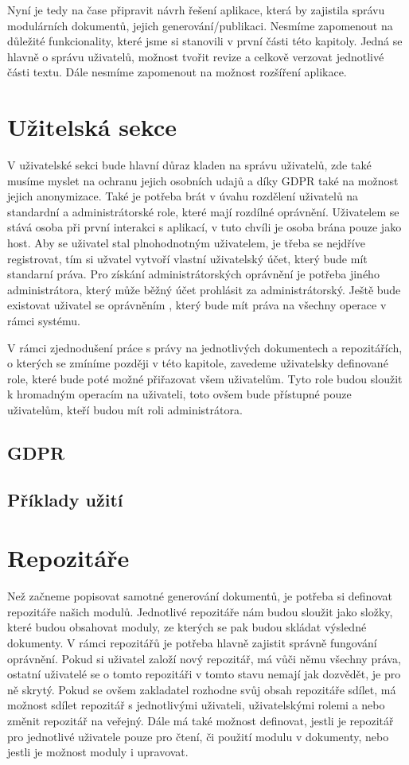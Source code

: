 Nyní je tedy na čase připravit návrh řešení aplikace, která by zajistila správu modulárních dokumentů, jejich generování/publikaci. Nesmíme zapomenout
na důležité funkcionality, které jsme si stanovili v první části této kapitoly. Jedná se hlavně o správu uživatelů, možnost tvořit revize a celkově
verzovat jednotlivé části textu. Dále nesmíme zapomenout na možnost rozšíření aplikace.

\section{Užitelská sekce}

V uživatelské sekci bude hlavní důraz kladen na správu uživatelů, zde také musíme myslet na ochranu jejich osobních udajů a díky GDPR také na
možnost jejich anonymizace. Také je potřeba brát v úvahu rozdělení uživatelů na standardní a administrátorské role, které mají rozdílné oprávnění.
Uživatelem se stává osoba při první interakci s aplikací, v tuto chvíli je osoba brána pouze jako host. Aby se uživatel stal plnohodnotným uživatelem,
je třeba se nejdříve registrovat, tím si užvatel vytvoří vlastní uživatelský účet, který bude mít standarní práva. Pro získání administrátorských
oprávnění je potřeba jiného administrátora, který může běžný účet prohlásit za administrátorský. Ještě bude existovat uživatel se oprávněním
, který bude mít práva na všechny operace v rámci systému.

V rámci zjednodušení práce s právy na jednotlivých dokumentech a repozitářích, o kterých se zmíníme později v této kapitole, zavedeme uživatelsky
definované role, které bude poté možné přiřazovat všem uživatelům. Tyto role budou sloužit k hromadným operacím na uživateli, toto ovšem bude
přístupné pouze uživatelům, kteří budou mít roli administrátora.

\subsection{GDPR}
\subsection{Příklady užití}

\section{Repozitáře}

Než začneme popisovat samotné generování dokumentů, je potřeba si definovat repozitáře našich modulů. Jednotlivé repozitáře nám budou sloužit jako složky,
které budou obsahovat moduly, ze kterých se pak budou skládat výsledné dokumenty. V rámci repozitářů je potřeba hlavně zajistit správně fungování oprávnění.
Pokud si uživatel založí nový repozitář, má vůči němu všechny práva, ostatní uživatelé se o tomto repozitáři v tomto stavu nemají jak dozvědět, je pro ně
skrytý. Pokud se ovšem zakladatel rozhodne svůj obsah repozitáře sdílet, má možnost sdílet repozitář s jednotlivými uživateli, uživatelskými rolemi a nebo
změnit repozitář na veřejný. Dále má také možnost definovat, jestli je repozitář pro jednotlivé uživatele pouze pro čtení, či použití modulu v dokumenty,
nebo jestli je možnost moduly i upravovat.

